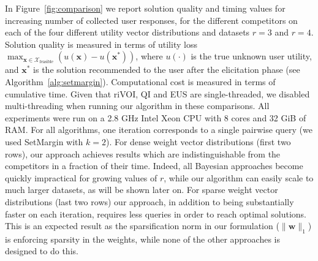 \documentclass{article}
\renewcommand\[{\begin{equation}}
\renewcommand\]{\end{equation}}
\newcommand{\calvar}[1]{\ensuremath{\mathcal{#1}}}
\newcommand{\calX}{\calvar{X}}
\newcommand{\vecvar}[1]{\ensuremath{\boldsymbol{#1}}}
\newcommand{\vw}{\vecvar{w}}
\newcommand{\vx}{\vecvar{x}}
\newcommand{\andrea}[1]{{\bf \textcolor{blue}{{\fbox{Andrea:} #1}}}}
\begin{document}

In Figure~\ref{fig:comparison} we report solution quality and timing
values for increasing number of collected user responses, for the
different competitors on each of the four different utility vector
distributions and datasets $r\!=\!3$ and $r\!=\!4$. Solution quality is
measured in terms of utility loss $ \max_{\vx\in\calX_\text{feasible}} \left( u(\vx) - u(\vx^*) \right)$,
where $u(\cdot)$ is the true unknown user utility, and $\vx^*$ is the
solution recommended to the user after the elicitation phase (see
Algorithm~\ref{alg:setmargin}). Computational cost is measured in
terms of cumulative time. Given that {\sc riVOI},  {\sc QI} and
{\sc EUS} are single-threaded, we disabled multi-threading when running our
algorithm in these comparisons. All experiments were run on a 2.8 GHz Intel
Xeon CPU with 8 cores and 32 GiB of RAM.
For all algorithms, one iteration corresponds to a single pairwise query (we
used {\sc SetMargin} with $k=2$).
For dense weight vector distributions (first two rows), our approach
achieves results which are indistinguishable from the competitors in a
fraction of their time.  Indeed, all Bayesian approaches
 become quickly impractical for growing values of $r$,
while our algorithm can easily scale to much larger datasets, as will
be shown later on. For sparse weight vector distributions (last two
rows) our approach, in addition to being substantially faster on each
iteration, requires less queries in order to reach optimal
solutions. This is an expected result as the sparsification norm in
our formulation ($\| \vw \|_1$) is enforcing sparsity in the weights, 
while none of the other approaches is %
designed to do this. %
\end{document}
